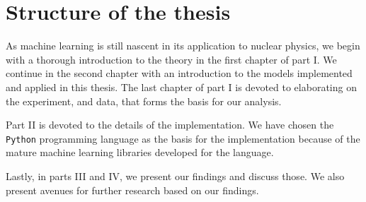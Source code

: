 \section{Structure of the thesis}

As machine learning is still nascent in its application to nuclear physics, we begin with a thorough introduction to the theory in the first chapter of part I. We continue in the second chapter with an introduction to the models implemented and applied in this thesis. The last chapter of part I is devoted to elaborating on the experiment, and data, that forms the basis for our analysis.

Part II is devoted to the details of the implementation. We have chosen the \lstinline{Python} programming language as the basis for the implementation because of the mature machine learning libraries developed for the language. 

Lastly, in parts III and IV, we present our findings and discuss those. We also present avenues for further research based on our findings.
